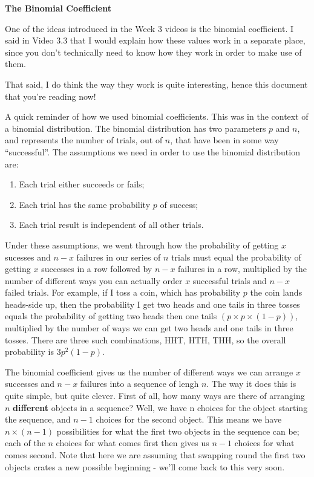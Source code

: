 \documentclass[11pt,a4paper]{article}
\begin{document}
 
\textbf{The Binomial Coefficient}
\vspace{0.2cm}

One of the ideas introduced in the Week 3 videos is the binomial coefficient. I said in Video 3.3 that I would explain how these values work in a separate place, since you don't technically need to know how they work in order to make use of them.

\vspace{0.1cm}
That said, I do think the way they work is quite interesting, hence this document that you're reading now!

\vspace{0.1cm}
A quick reminder of how we used binomial coefficients. This was in the context of a binomial distribution. The binomial distribution has two parameters $p$ and $n$, and represents the number of trials, out of $n$, that have been in some way ``successful''. The assumptions we need in order to use the binomial distribution are:
\begin{enumerate}
\item Each trial either succeeds or fails;
\item Each trial has the same probability $p$ of success;
\item Each trial result is independent of all other trials.
\end{enumerate}

Under these assumptions, we went through how the probability of getting $x$ sucesses and $n-x$ failures in our series of $n$ trials must equal the probability of getting $x$ successes in a row followed by $n-x$ failures in a row, multiplied by the number of different ways you can actually order $x$ successful trials and $n-x$ failed trials. For example, if I toss a coin, which has probability $p$ the coin lands heads-side up, then the probability I get two heads and one tails in three tosses equals the probability of getting two heads then one tails $(p\times p \times (1-p))$, multiplied by the number of ways we can get two heads and one tails in three tosses. There are three such combinations, HHT, HTH, THH, so the overall probability is $3p^2(1-p)$.
\vspace{0.1cm}

The binomial coefficient gives us the number of different ways we can arrange $x$ successes and $n-x$ failures into a sequence of lengh $n$. The way it does this is quite simple, but quite clever. First of all, how many ways are there of arranging $n$ \textbf{different} objects in a sequence? Well, we have n choices for the object starting the sequence, and $n-1$ choices for the second object. This means we have $n\times (n-1)$ possibilities for what the first two objects in the sequence can be; each of the $n$ choices for what comes first then gives us $n-1$ choices for what comes second. Note that here we are assuming that swapping round the first two objects crates a new possible beginning - we'll come back to this very soon.
\vspace{0.1cm}
\end{document}

